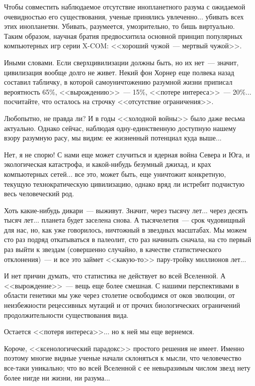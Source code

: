 \documentclass{scrbook}
\newcommand{\flqq}{<<}
\newcommand{\frqq}{>>}
\newcommand{\mdash}{~--- }
\begin{document}
Чтобы совместить наблюдаемое отсутствие инопланетного разума с ожидаемой очевидностью его существования, ученые принялись увлеченно... убивать всех этих инопланетян. Убивать, разумеется, умозрительно, то бишь виртуально. Таким образом, научная братия предвосхитила основной принцип популярных компьютерных игр серии X-COM: {\flqq}хороший чужой{\mdash}мертвый чужой{\frqq}.

Иными словами. Если сверхцивилизации должны быть, но их нет{\mdash}значит, цивилизация вообще долго не живет. Некий фон Хорнер еще полвека назад составил табличку, в которой самоуничтожению разумной жизни приписал вероятность 65\%, {\flqq}вырождению{\frqq}{\mdash}15\%, {\flqq}потере интереса{\frqq}{\mdash}20\%... посчитайте, что осталось на строчку {\flqq}отсутствие ограничения{\frqq}.

Любопытно, не правда ли? И в годы {\flqq}холодной войны{\frqq} было даже весьма актуально. Однако сейчас, наблюдая одну-единственную доступную нашему взору разумную расу, мы видим: ее жизненный потенциал куда выше...

Нет, я не спорю! С нами еще может случиться и ядерная война Севера и Юга, и экологическая катастрофа, и какой-нибудь безумный джихад, и крах компьютерных сетей... все это, может быть, еще уничтожит конкретную, текущую технократическую цивилизацию, однако вряд ли истребит подчистую весь человеческий род.

Хоть какие-нибудь дикари{\mdash}выживут. Значит, через тысячу лет... через десять тысяч лет... планета будет заселена снова. А тысячелетия{\mdash}срок чудовищный для нас, но, как уже говорилось, ничтожный в звездных масштабах. Мы можем сто раз подряд откатываться в палеолит, сто раз начинать сначала, на сто первый раз выйти к звездам (совершенно случайно, в качестве статистического отклонения){\mdash}и все это займет {\flqq}какую-то{\frqq} пару-тройку миллионов лет...

И нет причин думать, что статистика не действует во всей Вселенной.
А {\flqq}вырождение{\frqq}{\mdash}вещь еще более смешная. С нашими перспективами в области генетики мы уже через столетие освободимся от оков эволюции, от неизбежности рецессивных мутаций и от прочих биологических ограничений продолжительности существования вида.

Остается {\flqq}потеря интереса{\frqq}... но к ней мы еще вернемся.

Короче, {\flqq}ксенологический парадокс{\frqq} простого решения не имеет. Именно поэтому многие видные ученые начали склоняться к мысли, что человечество все-таки уникально; что во всей Вселенной с ее невыразимым числом звезд нету более нигде ни жизни, ни разума...
\end{document}

